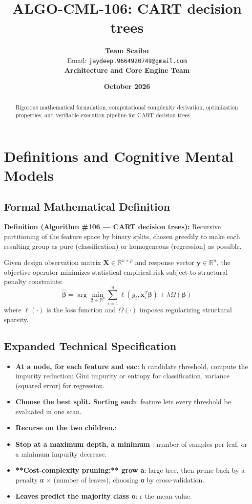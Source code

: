 \documentclass[11pt,a4paper]{article}
\title{\textbf{ALGO-CML-106: CART decision trees}}
\author{\textbf{Team Scaibu} \\ \small Email: \texttt{jaydeep.9664920749@gmail.com} \\ \small \textbf{Architecture and Core Engine Team}}
\date{\textbf{October 2026}}
\theoremstyle{definition}
\begin{document}
\maketitle

\begin{abstract}
Rigorous mathematical formulation, computational complexity derivation, optimization properties, and verifiable execution pipeline for CART decision trees.
\end{abstract}

\section{Definitions and Cognitive Mental Models}

\subsection{Formal Mathematical Definition}
\textbf{Definition (Algorithm \#106 --- CART decision trees):}
Recursive partitioning of the feature space by binary splits, chosen greedily to make each resulting group as pure (classification) or homogeneous (regression) as possible.

Given design observation matrix $\mathbf{X} \in \mathbb{R}^{n \times p}$ and response vector $\mathbf{y} \in \mathbb{R}^n$, the objective operator minimizes statistical empirical risk subject to structural penalty constraints:
\begin{equation}
\hat{\boldsymbol{\beta}} = \arg\min_{\boldsymbol{\beta} \in \mathbb{R}^p} \sum_{i=1}^n \ell(y_i, \mathbf{x}_i^T \boldsymbol{\beta}) + \lambda \Omega(\boldsymbol{\beta})
\end{equation}
where $\ell(\cdot)$ is the loss function and $\Omega(\cdot)$ imposes regularizing structural sparsity.

\subsection{Expanded Technical Specification}
\begin{itemize}
\item \textbf{At a node, for each feature and eac}: h candidate threshold, compute the impurity reduction: Gini impurity or entropy for classification, variance (squared error) for regression.
\item \textbf{Choose the best split. Sorting each}:  feature lets every threshold be evaluated in one scan.
\item \textbf{Recurse on the two children.}: 
\item \textbf{Stop at a maximum depth, a minimum }: number of samples per leaf, or a minimum impurity decrease.
\item \textbf{**Cost-complexity pruning:** grow a}:  large tree, then prune back by a penalty α × (number of leaves), choosing α by cross-validation.
\item \textbf{Leaves predict the majority class o}: r the mean value.
\end{itemize}
\end{document}
